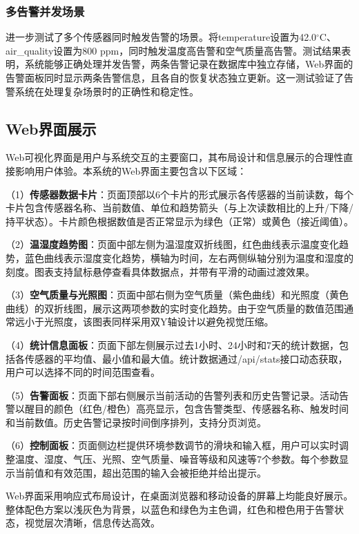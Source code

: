 \documentclass[12pt,a4paper]{ctexart}
\begin{document}
\subsubsection{多告警并发场景}

进一步测试了多个传感器同时触发告警的场景。将temperature设置为42.0$^\circ$C、air\_quality设置为800 ppm，同时触发温度高告警和空气质量高告警。测试结果表明，系统能够正确处理并发告警，两条告警记录在数据库中独立存储，Web界面的告警面板同时显示两条告警信息，且各自的恢复状态独立更新。这一测试验证了告警系统在处理复杂场景时的正确性和稳定性。

\subsection{Web界面展示}

Web可视化界面是用户与系统交互的主要窗口，其布局设计和信息展示的合理性直接影响用户体验。本系统的Web界面主要包含以下区域：

（1）\textbf{传感器数据卡片}：页面顶部以6个卡片的形式展示各传感器的当前读数，每个卡片包含传感器名称、当前数值、单位和趋势箭头（与上次读数相比的上升/下降/持平状态）。卡片颜色根据数值是否正常显示为绿色（正常）或黄色（接近阈值）。

（2）\textbf{温湿度趋势图}：页面中部左侧为温湿度双折线图，红色曲线表示温度变化趋势，蓝色曲线表示湿度变化趋势，横轴为时间，左右两侧纵轴分别为温度和湿度的刻度。图表支持鼠标悬停查看具体数据点，并带有平滑的动画过渡效果。

（3）\textbf{空气质量与光照图}：页面中部右侧为空气质量（紫色曲线）和光照度（黄色曲线）的双折线图，展示这两项参数的实时变化趋势。由于空气质量的数值范围通常远小于光照度，该图表同样采用双Y轴设计以避免视觉压缩。

（4）\textbf{统计信息面板}：页面下部左侧展示过去1小时、24小时和7天的统计数据，包括各传感器的平均值、最小值和最大值。统计数据通过/api/stats接口动态获取，用户可以选择不同的时间范围查看。

（5）\textbf{告警面板}：页面下部右侧展示当前活动的告警列表和历史告警记录。活动告警以醒目的颜色（红色/橙色）高亮显示，包含告警类型、传感器名称、触发时间和当前数值。历史告警记录按时间倒序排列，支持分页浏览。

（6）\textbf{控制面板}：页面侧边栏提供环境参数调节的滑块和输入框，用户可以实时调整温度、湿度、气压、光照、空气质量、噪音等级和风速等7个参数。每个参数显示当前值和有效范围，超出范围的输入会被拒绝并给出提示。

Web界面采用响应式布局设计，在桌面浏览器和移动设备的屏幕上均能良好展示。整体配色方案以浅灰色为背景，以蓝色和绿色为主色调，红色和橙色用于告警状态，视觉层次清晰，信息传达高效。
\end{document}
